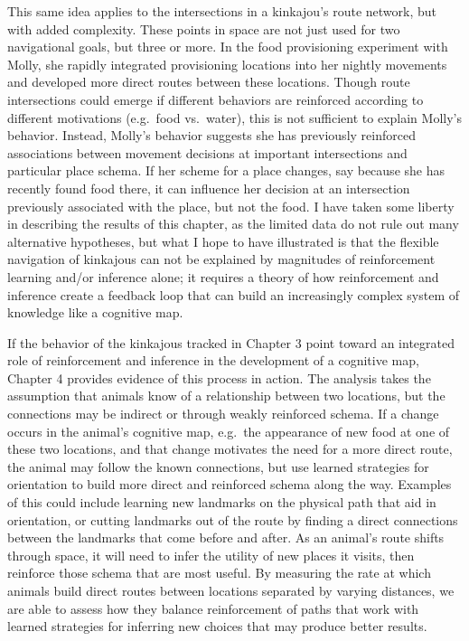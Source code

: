 \documentclass[twoside,12pt,final]{ucthesis-CA2012}
\begin{document}
\begin{ucmainmatter}
This same idea applies to the intersections in a kinkajou's route network, but with added complexity. These points in space are not just used for two navigational goals, but three or more. In the food provisioning experiment with Molly, she rapidly integrated provisioning locations into her nightly movements and developed more direct routes between these locations. Though route intersections could emerge if different behaviors are reinforced according to different motivations (e.g.~food vs.~water), this is not sufficient to explain Molly's behavior. Instead, Molly's behavior suggests she has previously reinforced associations between movement decisions at important intersections and particular place schema. If her scheme for a place changes, say because she has recently found food there, it can influence her decision at an intersection previously associated with the place, but not the food. I have taken some liberty in describing the results of this chapter, as the limited data do not rule out many alternative hypotheses, but what I hope to have illustrated is that the flexible navigation of kinkajous can not be explained by magnitudes of reinforcement learning and/or inference alone; it requires a theory of how reinforcement and inference create a feedback loop that can build an increasingly complex system of knowledge like a cognitive map.

If the behavior of the kinkajous tracked in Chapter 3 point toward an integrated role of reinforcement and inference in the development of a cognitive map, Chapter 4 provides evidence of this process in action. The analysis takes the assumption that animals know of a relationship between two locations, but the connections may be indirect or through weakly reinforced schema. If a change occurs in the animal's cognitive map, e.g.~the appearance of new food at one of these two locations, and that change motivates the need for a more direct route, the animal may follow the known connections, but use learned strategies for orientation to build more direct and reinforced schema along the way. Examples of this could include learning new landmarks on the physical path that aid in orientation, or cutting landmarks out of the route by finding a direct connections between the landmarks that come before and after. As an animal's route shifts through space, it will need to infer the utility of new places it visits, then reinforce those schema that are most useful. By measuring the rate at which animals build direct routes between locations separated by varying distances, we are able to assess how they balance reinforcement of paths that work with learned strategies for inferring new choices that may produce better results.


\end{ucmainmatter}
\end{document}
